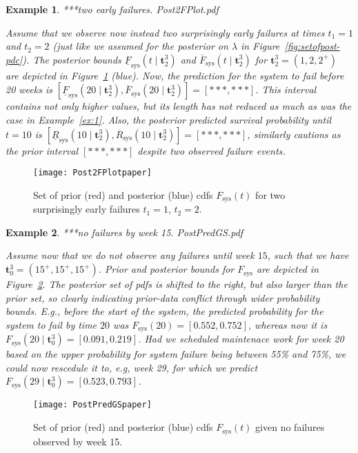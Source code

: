 \documentclass[12pt,a4paper,twocolumn,fleqn]{narms}
\renewcommand{\vec}[1]{{\bm#1}}
\newcommand{\ul}[1]{\underline{#1}}
\newcommand{\ol}[1]{\overline{#1}}
\newcommand{\lRsys}{\ul{R}_\text{sys}}
\newcommand{\uRsys}{\ol{R}_\text{sys}}
\newcommand{\Fsys}{F_\text{sys}}
\newcommand{\lFsys}{\ul{F}_\text{sys}}
\newcommand{\uFsys}{\ol{F}_\text{sys}}
\newtheorem{example}{Example}
\begin{document}
\begin{example}
\label{ex:2}
***two early failures. Post2FPlot.pdf

Assume that we observe now instead two surprisingly early failures at times $t_1 = 1$ and $t_2 = 2$
(just like we assumed for the posterior on $\lambda$ in Figure~\ref{fig:setofpost-pdc}).
The posterior bounds $\lFsys(t \mid \vec{t}_2^3)$ and $\uFsys(t \mid \vec{t}_2^3)$
for $\vec{t}_2^3 = (1, 2, 2^+)$ 
are depicted in Figure~\ref{fig:exampletwoearlyfailures} (blue).
Now, the prediction for the system to fail before 20 weeks
is $[\lFsys(20 \mid \vec{t}_2^3), \uFsys(20 \mid \vec{t}_2^3)] = [***,***]$.
This interval contains not only higher values,
but its length has not reduced as much as was the case in Example~\ref{ex:1}.
Also, the posterior predicted survival probability until $t=10$
is $[\lRsys(10 \mid \vec{t}_2^3), \uRsys(10 \mid \vec{t}_2^3)] = [***,***]$,
similarly cautions as the prior interval $[***,***]$
despite two observed failure events. 
\end{example}

\begin{figure}
\texttt{[image: Post2FPlotpaper]}
\caption{Set of prior (red) and posterior (blue) cdfs $F_\text{sys}(t)$ for two surprisingly early failures $t_1 = 1$, $t_2 = 2$.}
\label{fig:exampletwoearlyfailures}
\end{figure}

\begin{example}
\label{ex:3}
***no failures by week 15. PostPredGS.pdf

Assume now that we do not observe any failures until week $15$,
such that we have $\vec{t}_0^3 = (15^+, 15^+, 15^+)$.
Prior and posterior bounds for $\Fsys$ are depicted in Figure~\ref{fig:examplenofailures}.
The posterior set of pdfs is shifted to the right, but also larger than the prior set,
so clearly indicating prior-data conflict through wider probability bounds.
E.g., before the start of the system, the predicted probability for the system to fail by time $20$
was $\Fsys(20) = [0.552, 0.752]$, whereas now it is $\Fsys(20 \mid \vec{t}_0^3) = [0.091,0.219]$.
Had we scheduled maintenace work for week 20
based on the upper probability for system failure being between 55\% and 75\%,
we could now rescedule it to, e.g, week 29,
for which we predict $\Fsys(29 \mid \vec{t}_0^3) = [0.523,0.793]$.
\end{example}

\begin{figure}
\texttt{[image: PostPredGSpaper]}
\caption{Set of prior (red) and posterior (blue) cdfs $F_\text{sys}(t)$ given no failures observed by week 15.}
\label{fig:examplenofailures}
\end{figure}
\end{document}
